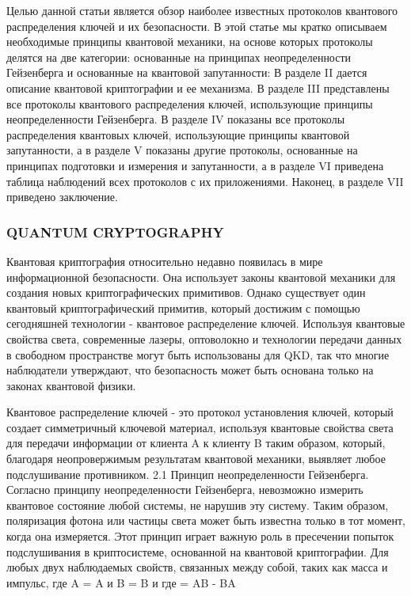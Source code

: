 Целью данной статьи является обзор наиболее известных протоколов квантового распределения ключей и их безопасности. В этой статье мы кратко описываем необходимые принципы квантовой механики, на основе которых протоколы делятся на две категории: основанные на принципах неопределенности Гейзенберга и основанные на квантовой запутанности: В разделе II дается описание квантовой криптографии и ее механизма. В разделе III представлены все протоколы квантового распределения ключей, использующие принципы неопределенности Гейзенберга. В разделе IV показаны все протоколы распределения квантовых ключей, использующие принципы квантовой запутанности, а в разделе V показаны другие протоколы, основанные на принципах подготовки и измерения и запутанности, а в разделе VI приведена таблица наблюдений всех протоколов с их приложениями. Наконец, в разделе VII приведено заключение.

\subsubsection{QUANTUM CRYPTOGRAPHY}
Квантовая криптография относительно недавно появилась в мире информационной безопасности. Она использует законы квантовой механики для создания новых криптографических примитивов. Однако существует один квантовый криптографический примитив, который достижим с помощью сегодняшней технологии - квантовое распределение ключей. Используя квантовые свойства света, современные лазеры, оптоволокно и технологии передачи данных в свободном пространстве могут быть использованы для QKD, так что многие наблюдатели утверждают, что безопасность может быть основана только на законах квантовой физики.

Квантовое распределение ключей - это протокол установления ключей, который создает симметричный ключевой материал, используя квантовые свойства света для передачи информации от клиента A к клиенту B таким образом, который, благодаря неопровержимым результатам квантовой механики, выявляет любое подслушивание противником.
2.1 Принцип неопределенности Гейзенберга. Согласно принципу неопределенности Гейзенберга, невозможно измерить квантовое состояние любой системы, не нарушив эту систему. Таким образом, поляризация фотона или частицы света может быть известна только в тот момент, когда она измеряется. Этот принцип играет важную роль в пресечении попыток подслушивания в криптосистеме, основанной на квантовой криптографии.
Для любых двух наблюдаемых свойств, связанных между собой, таких как масса и импульс, где A = A и B = B и где = AB - BA

